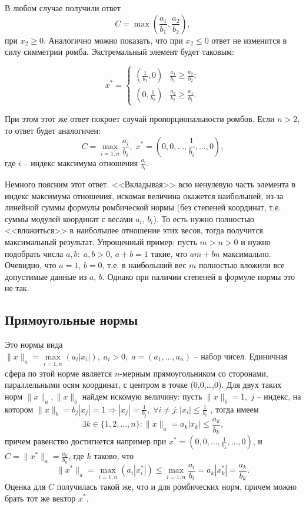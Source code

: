 \documentclass{article}
\begin{document}
В любом случае получили ответ
$$ C = \max\left(\frac{a_1}{b_1}, \frac{a_2}{b_2}\right), $$
при $x_2 \geqslant 0$. Аналогично можно показать, что при $x_2 \leqslant 0$ ответ не изменится в силу симметрии ромба. Экстремальный элемент будет таковым:

\begin{equation*} x^* = 
	\begin{cases}
		\left(\frac{1}{b_1},0\right) & \frac{a_1}{b_1} \geqslant \frac{a_2}{b_2}; \\[0.9ex]
		\left(0,\frac{1}{b_2}\right) & \frac{a_2}{b_2} \geqslant \frac{a_1}{b_1}.
	\end{cases}
\end{equation*} 

При этом этот же ответ покроет случай пропорциональности ромбов. Если $n > 2$, то ответ будет аналогичен:
$$ C = \max\limits_{i=\overline{1,n}}\frac{a_i}{b_i}, \; x^* = \left(0,0,\ldots,\frac{1}{b_i},\ldots,0\right), $$
где $i$ -- индекс максимума отношения $\frac{a_i}{b_i}$.

Немного поясним этот ответ. <<Вкладывая>> всю ненулевую часть элемента в индекс максимума отношения, искомая величина окажется наибольшей, из-за линейной суммы формулы ромбической нормы (без степеней координат, т.е. суммы модулей координат с весами $a_i$, $b_i$). То есть нужно полностью <<вложиться>> в наибольшее отношение этих весов, тогда получится максимальный результат. Упрощенный пример: пусть $m > n > 0$ и нужно подобрать числа $a, b : \; a, b > 0, \, a + b = 1$ такие, что $am+bn$ максимально. Очевидно, что $a=1$, $b=0$, т.е. в наибольший вес $m$ полностью вложили все допустимые данные из $a$, $b$. Однако при наличии степеней в формуле нормы это не так.

\subsection{Прямоугольные нормы}

Это нормы вида $\|x\|_a = \max\limits_{i=\overline{1,n}}(a_i|x_i|), \; a_i > 0, \; a = (a_1,\ldots,a_n) \text{ -- набор чисел.}$ Единичная сфера по этой норме является $n$-мерным прямоугольником со сторонами, параллельными осям координат, с центром в точке (0,0,\ldots,0). Для двух таких норм $\|x\|_a, \|x\|_b$ найдем искомую величину: пусть $\|x\|_b = 1, \; j$ -- индекс, на котором $ \|x\|_b = b_j|x_j| = 1 \Rightarrow |x_j| = \frac{1}{b_j}, \; \forall{i \neq j}: |x_i| \leqslant \frac{1}{b_i}$ , тогда имеем
$$ \exists{k \in \{1,2,\ldots,n\}}: \|x\|_a = a_k|x_k| \leqslant \frac{a_k}{b_k}, $$
причем равенство достигнется например при $ x^* = \left(0,0,\ldots,\frac{1}{b_k},\ldots,0\right)$, и $ C = \|x^*\|_a = \frac{a_k}{b_k}$, где $k$ таково, что 
$$ \|x^*\|_a = \max\limits_{i=\overline{1,n}}(a_i|x_i^*|) \leqslant \max\limits_{i=\overline{1,n}}\frac{a_i}{b_i} = a_k|x_k^*| = \frac{a_k}{b_k}. $$ 
Оценка для $C$ получилась такой же, что и для ромбических норм, причем можно брать тот же вектор $x^*$. 
\end{document}
